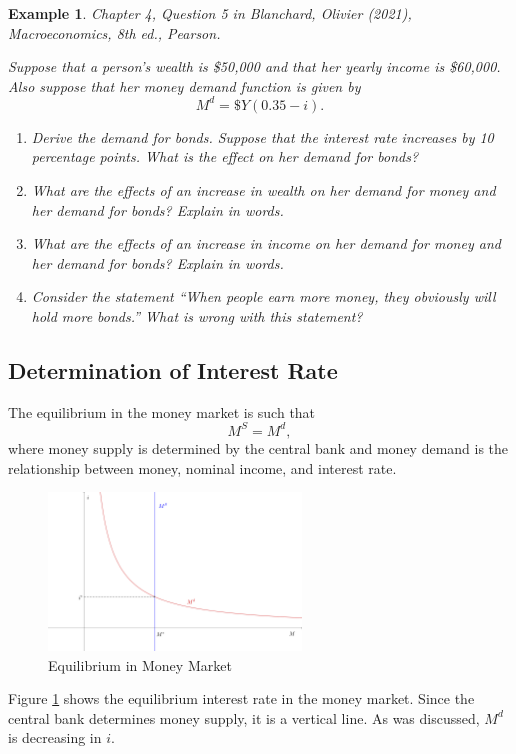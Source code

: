 \documentclass[12pt]{article}
\newtheorem{example}{Example}
\begin{document}
\begin{example}
	Chapter 4, Question 5 in Blanchard, Olivier (2021), \textit{Macroeconomics}, 8th ed., Pearson.

	Suppose that a person's wealth is \$50,000 and that her yearly income is \$60,000. Also suppose that her money demand function is given by
	\[M^d = \$ Y (0.35 - i).\]

	\begin{enumerate}[label=(\alph*)]
		\item Derive the demand for bonds. Suppose that the interest rate increases by 10 percentage points. What is the effect on her demand for bonds?
		\vspace{36pt}
		\item What are the effects of an increase in wealth on her demand for money and her demand for bonds? Explain in words.
		\vspace{36pt}
		\item What are the effects of an increase in income on her demand for money and her demand for bonds? Explain in words.
		\vspace{36pt}
		\item Consider the statement ``When people earn more money, they obviously will hold more bonds.'' What is wrong with this statement?
		\vspace{36pt}
	\end{enumerate}
\end{example}

\subsection*{Determination of Interest Rate}
The equilibrium in the money market is such that 
\[M^S = M^d,\]
where money supply is determined by the central bank and money demand is the relationship between money, nominal income, and interest rate. 

\begin{figure}[htp]
    \centering
    \includegraphics[width=0.6\textwidth]{money_eqm_01.png}
    \caption{Equilibrium in Money Market}
    \label{fig:money_eqm_01}
\end{figure}
Figure \ref{fig:money_eqm_01} shows the equilibrium interest rate in the money market. Since the central bank determines money supply, it is a vertical line. As was discussed, $M^d$ is decreasing in $i$.
\end{document}
